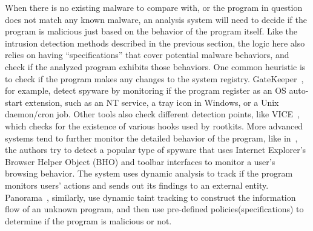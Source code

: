 When there is no existing malware to compare with, or the program in question 
does not match any known malware, an analysis system will need to decide if
the program is malicious just based on the behavior of the program itself. Like
the intrusion detection methods described in the previous section, the logic
here also relies on having ``specifications'' that cover potential malware 
behaviors, and check if the analyzed program exhibits those behaviors. One 
common heuristic is to check if the program makes any changes to the system
registry. GateKeeper~\cite{wang2004gatekeeper}, for example, detect spyware
by monitoring if the program register as an OS auto-start extension, such as 
an NT service, a tray icon in Windows, or a Unix daemon/cron job. Other tools
also check different detection points, like VICE~\cite{bulter2004vice}, which
checks for the existence of various hooks used by rootkits. More advanced 
systems tend to further monitor the detailed behavior of the program, like 
in~\cite{kirda2006behavior}, the authors try to detect a popular type of
spyware that uses Internet Explorer’s Browser Helper Object (BHO) and 
toolbar interfaces to monitor a user’s browsing behavior. The system uses 
dynamic analysis to track if the program monitors users' actions and sends
out its findings to an external entity. Panorama~\cite{yin2007panorama}, 
similarly, use dynamic taint tracking to construct the information flow of
an unknown program, and then use pre-defined policies(specifications) to 
determine if the program is malicious or not.